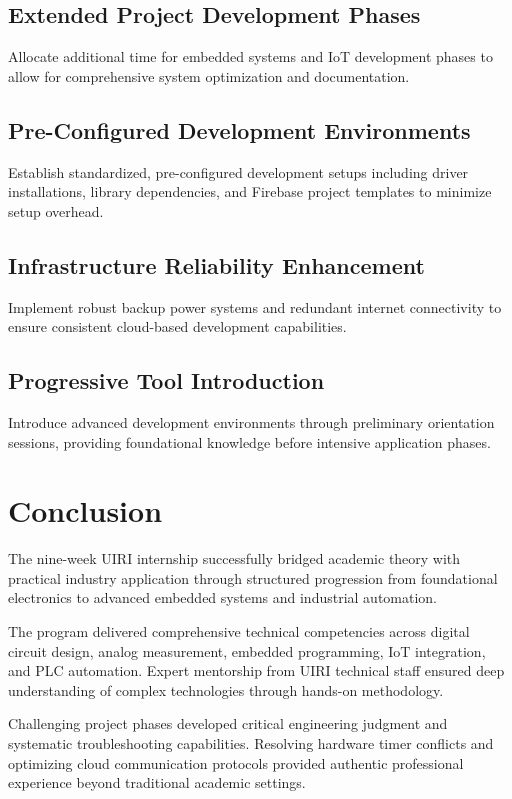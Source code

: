 \documentclass[12pt,a4paper]{report}
\begin{document}
\subsection{Extended Project Development Phases}
\noindent Allocate additional time for embedded systems and IoT development phases to allow for comprehensive system optimization and documentation.

\subsection{Pre-Configured Development Environments}
\noindent Establish standardized, pre-configured development setups including driver installations, library dependencies, and Firebase project templates to minimize setup overhead.

\subsection{Infrastructure Reliability Enhancement}
\noindent Implement robust backup power systems and redundant internet connectivity to ensure consistent cloud-based development capabilities.

\subsection{Progressive Tool Introduction}
\noindent Introduce advanced development environments through preliminary orientation sessions, providing foundational knowledge before intensive application phases.

\section{Conclusion}

\noindent The nine-week UIRI internship successfully bridged academic theory with practical industry application through structured progression from foundational electronics to advanced embedded systems and industrial automation.

\noindent The program delivered comprehensive technical competencies across digital circuit design, analog measurement, embedded programming, IoT integration, and PLC automation. Expert mentorship from UIRI technical staff ensured deep understanding of complex technologies through hands-on methodology.

\noindent Challenging project phases developed critical engineering judgment and systematic troubleshooting capabilities. Resolving hardware timer conflicts and optimizing cloud communication protocols provided authentic professional experience beyond traditional academic settings.
\end{document}
